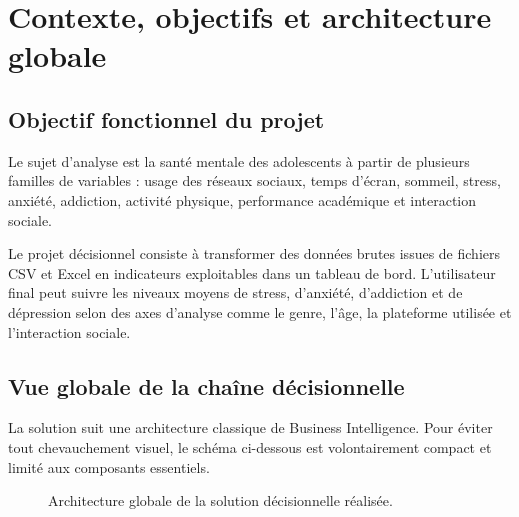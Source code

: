 \documentclass[11pt,a4paper]{report}
\begin{document}
\chapter{Contexte, objectifs et architecture globale}

\section{Objectif fonctionnel du projet}

Le sujet d'analyse est la santé mentale des adolescents à partir de plusieurs familles de variables : usage des réseaux sociaux, temps d'écran, sommeil, stress, anxiété, addiction, activité physique, performance académique et interaction sociale.

\begin{definitionbox}
Le projet décisionnel consiste à transformer des données brutes issues de fichiers CSV et Excel en indicateurs exploitables dans un tableau de bord. L'utilisateur final peut suivre les niveaux moyens de stress, d'anxiété, d'addiction et de dépression selon des axes d'analyse comme le genre, l'âge, la plateforme utilisée et l'interaction sociale.
\end{definitionbox}

\section{Vue globale de la chaîne décisionnelle}

La solution suit une architecture classique de Business Intelligence. Pour éviter tout chevauchement visuel, le schéma ci-dessous est volontairement compact et limité aux composants essentiels.

\begin{figure}[H]
\centering
{}
\caption{Architecture globale de la solution décisionnelle réalisée.}
\end{figure}
\end{document}
